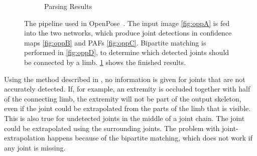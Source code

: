 \begin{figure}[h]
\begin{subfigure}[t]{0.24\textwidth}
    \caption{Parsing Results}
    \label{fig:oppE}
  \end{subfigure}
  \caption[OpenPose pipeline]{The pipeline used in OpenPose~\cite{cao2017realtime, cao2019openpose}. The input image \ref{fig:oppA} is fed into the two networks, which produce joint detections in confidence maps \ref{fig:oppB} and PAFs  \ref{fig:oppC}. Bipartite matching is performed in \ref{fig:oppD}, to determine which detected joints should be connected by a limb. \ref{fig:oppE} shows the finished results.}
  \label{fig:openpose_pipeline}
\end{figure}

Using the method described in \cite{cao2017realtime}, no information is given for joints that are not accurately detected. If, for example, an extremity is occluded together with half of the connecting limb, the extremity will not be part of the output skeleton, even if the joint could be extrapolated from the parts of the limb that is visible.
This is also true for undetected joints in the middle of a joint chain. The joint could be extrapolated using the surrounding joints. The problem with joint-extrapolation happens because of the bipartite matching, which does not work if any joint is missing.



